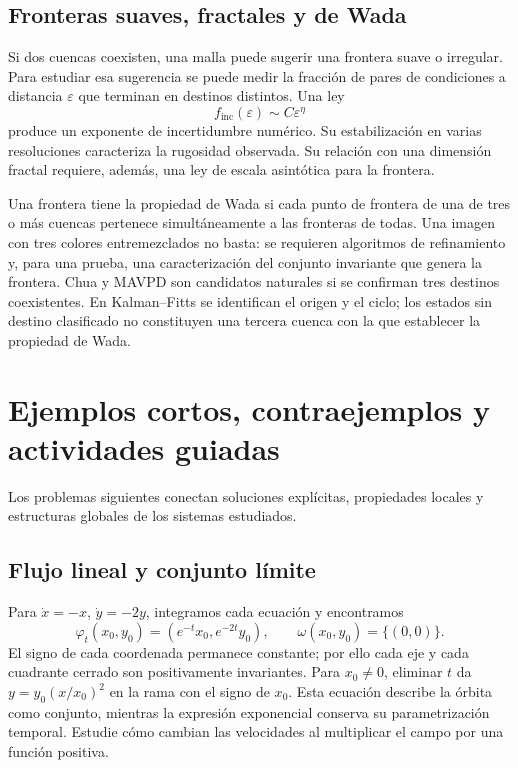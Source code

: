 \subsection{Fronteras suaves, fractales y de Wada}

\HAFOCardFractal

Si dos cuencas coexisten, una malla puede sugerir una frontera suave o
irregular. Para estudiar esa sugerencia se puede medir la fracción de pares
de condiciones a distancia \(\varepsilon\) que terminan en destinos distintos.
Una ley
\begin{equation}
 f_{\mathrm{inc}}(\varepsilon)\sim C\varepsilon^\eta
 \label{geo:eq:uncertainty-exponent}
\end{equation}
produce un exponente de incertidumbre numérico. Su estabilización en varias
resoluciones caracteriza la rugosidad observada. Su relación con una dimensión fractal requiere, además, una ley de escala asintótica para la frontera.

Una frontera tiene la propiedad de Wada si cada punto de frontera de una de
tres o más cuencas pertenece simultáneamente a las fronteras de todas. Una
imagen con tres colores entremezclados no basta: se requieren algoritmos de
refinamiento y, para una prueba, una caracterización del conjunto invariante
que genera la frontera. Chua y MAVPD son candidatos naturales si se confirman
tres destinos coexistentes. En Kalman--Fitts se identifican el origen y el
ciclo; los estados sin destino clasificado no constituyen una tercera cuenca
con la que establecer la propiedad de Wada.

\fi

\HAFOGeoRenderBlocktrue
\ifdefined\HAFOGeoBlockSelect
  \HAFOGeoRenderBlockfalse
  \ifdefined\HAFOGeoBlockChaos\HAFOGeoRenderBlocktrue\fi
\fi
\ifHAFOPedagogy
\ifHAFOGeoRenderBlock
\section{Ejemplos cortos, contraejemplos y actividades guiadas}
\label{sec:geo-activities}

Los problemas siguientes conectan soluciones explícitas, propiedades locales
y estructuras globales de los sistemas estudiados.

\subsection{Flujo lineal y conjunto límite}
Para \(\dot x=-x\), \(\dot y=-2y\), integramos cada ecuación y encontramos
\[
 \varphi_t(x_0,y_0)=(e^{-t}x_0,e^{-2t}y_0),\qquad
 \omega(x_0,y_0)=\{(0,0)\}.
\]
El signo de cada coordenada permanece constante; por ello cada eje y cada
cuadrante cerrado son positivamente invariantes. Para \(x_0\ne0\), eliminar
\(t\) da \(y=y_0(x/x_0)^2\) en la rama con el signo de \(x_0\).
Esta ecuación describe la órbita como conjunto, mientras la expresión
exponencial conserva su parametrización temporal. Estudie cómo cambian las
velocidades al multiplicar el campo por una función positiva.

